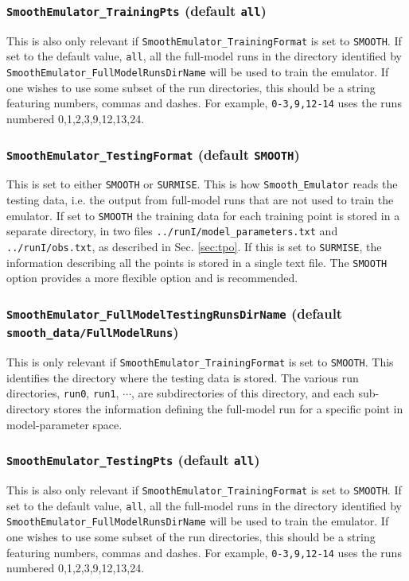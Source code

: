 \documentclass[UserManual.tex]{subfiles}
\begin{document}
\subsubsection{{\tt SmoothEmulator\_TrainingPts} (default {\tt all})}
This is also only relevant if {\tt SmoothEmulator\_TrainingFormat} is set to {\tt SMOOTH}. If set to the default value, {\tt all}, all the full-model runs in the directory identified by {\tt SmoothEmulator\_FullModelRunsDirName} will be used to train the emulator. If one wishes to use some subset of the run directories, this should be a string featuring numbers, commas and dashes. For example, {\tt 0-3,9,12-14} uses the runs numbered 0,1,2,3,9,12,13,24.

\subsubsection{{\tt SmoothEmulator\_TestingFormat} (default {\tt SMOOTH})}
This is set to either {\tt SMOOTH} or {\tt SURMISE}. This is how {\tt Smooth\_Emulator} reads the testing data, i.e. the output from full-model runs that are not used to train the emulator. If set to {\tt SMOOTH} the training data for each training point is stored in a separate directory, in two files {\tt ../runI/model\_parameters.txt} and {\tt ../runI/obs.txt}, as described in Sec. \ref{sec:tpo}. If this is set to {\tt SURMISE}, the information describing all the points is stored in a single text file. The {\tt SMOOTH} option provides a more flexible option and is recommended. 

\subsubsection{{\tt SmoothEmulator\_FullModelTestingRunsDirName} (default {\tt smooth\_data/FullModelRuns})}
This is only relevant if {\tt SmoothEmulator\_TrainingFormat} is set to {\tt SMOOTH}. This identifies the directory where the testing data is stored. The various run directories, {\tt run0}, {\tt run1}, $\cdots$, are subdirectories of this directory, and each sub-directory stores the information defining the full-model run for a specific point in model-parameter space.

\subsubsection{{\tt SmoothEmulator\_TestingPts} (default {\tt all})}
This is also only relevant if {\tt SmoothEmulator\_TrainingFormat} is set to {\tt SMOOTH}. If set to the default value, {\tt all}, all the full-model runs in the directory identified by {\tt SmoothEmulator\_FullModelRunsDirName} will be used to train the emulator. If one wishes to use some subset of the run directories, this should be a string featuring numbers, commas and dashes. For example, {\tt 0-3,9,12-14} uses the runs numbered 0,1,2,3,9,12,13,24.
\end{document}
